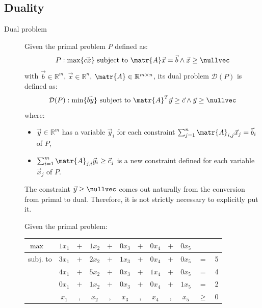 \subsection{Duality}

\begin{description}
    \item[Dual problem]
        Given the primal problem $P$ defined as: 
        \[ P: \max \{\vec{cx}\} \text{ subject to } \matr{A}\vec{x} = \vec{b} \land \vec{x} \geq \nullvec \]
        with $\vec{b} \in \mathbb{R}^m$, $\vec{x} \in \mathbb{R}^n$, $\matr{A} \in \mathbb{R}^{m \times n}$,
        its dual problem $\mathcal{D}(P)$ is defined as:
        \[ \mathcal{D}(P): \min\{\vec{by}\} \text{ subject to } \matr{A}^T\vec{y} \geq \vec{c} \land \vec{y} \geq \nullvec \]
        where:
        \begin{itemize}
            \item $\vec{y} \in \mathbb{R}^m$ has a variable $\vec{y}_i$ for each constraint $\sum_{j=1}^{n} \matr{A}_{i,j} \vec{x}_j = \vec{b}_i$ of $P$,
            \item $\sum_{i=1}^{m} \matr{A}_{j, i} \vec{y}_i \geq \vec{c}_j$ is a new constraint defined for each variable $\vec{x}_j$ of $P$.
        \end{itemize} 

        \begin{remark}
            The constraint $\vec{y} \geq \nullvec$ comes out naturally from the conversion from primal to dual.
            Therefore, it is not strictly necessary to explicitly put it.
        \end{remark}

        \begin{example}
            Given the primal problem:
            \begin{center}
                \begin{tabular}{lccccccccccc}
                    \toprule
                    $\max$ & $1x_1$ & $+$ & $1x_2$ & $+$ & \color{lightgray}$0x_3$ & $+$ & \color{lightgray}$0x_4$ & $+$ & \color{lightgray}$0x_5$ \\
                    \midrule
                    subj. to & $3x_1$ & $+$ & $2x_2$ & $+$ & $1x_3$ & $+$ & \color{lightgray}$0x_4$ & $+$ & \color{lightgray}$0x_5$ & $=$ & 5 \\
                             & $4x_1$ & $+$ & $5x_2$ & $+$ & \color{lightgray}$0x_3$ & $+$ & $1x_4$ & $+$ & \color{lightgray}$0x_5$ & $=$ & 4 \\
                             & \color{lightgray}$0x_1$ & $+$ & $1x_2$ & $+$ & \color{lightgray}$0x_3$ & $+$ & \color{lightgray}$0x_4$ & $+$ & $1x_5$ & $=$ & 2 \\
                    \midrule
                            & $x_1$ & , & $x_2$ & , & $x_3$ & , & $x_4$ & , & $x_5$ & $\geq$ & 0 \\
                    \bottomrule
                \end{tabular}
            \end{center}


\end{example}
\end{description}
